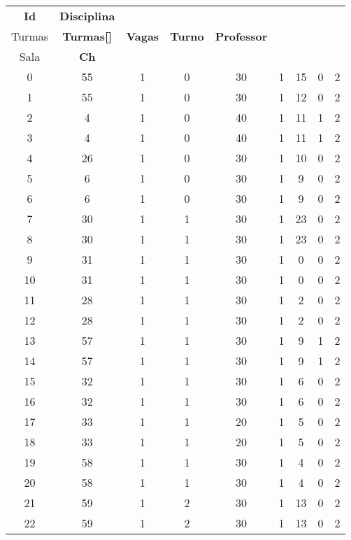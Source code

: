 \begin{apendices}
{\footnotesize
\begin{longtable}{|c|c|c|c|c|c|c|c|c|}
\hline
\textbf{Id} & \textbf{Disciplina} & \textbf{\begin{tabular}[c]{@{}c@{}}Nº de\\ Turmas\end{tabular}} & \textbf{Turmas{[}{]}} & \textbf{Vagas} & \textbf{Turno} & \textbf{Professor} & \textbf{\begin{tabular}[c]{@{}c@{}}Tipo de\\ Sala\end{tabular}} & \textbf{Ch} \\ \hline
0 & 55 & 1 & 0 & 30 & 1 & 15 & 0 & 2 \\ \hline
1 & 55 & 1 & 0 & 30 & 1 & 12 & 0 & 2 \\ \hline
2 & 4 & 1 & 0 & 40 & 1 & 11 & 1 & 2 \\ \hline
3 & 4 & 1 & 0 & 40 & 1 & 11 & 1 & 2 \\ \hline
4 & 26 & 1 & 0 & 30 & 1 & 10 & 0 & 2 \\ \hline
5 & 6 & 1 & 0 & 30 & 1 & 9 & 0 & 2 \\ \hline
6 & 6 & 1 & 0 & 30 & 1 & 9 & 0 & 2 \\ \hline
7 & 30 & 1 & 1 & 30 & 1 & 23 & 0 & 2 \\ \hline
8 & 30 & 1 & 1 & 30 & 1 & 23 & 0 & 2 \\ \hline
9 & 31 & 1 & 1 & 30 & 1 & 0 & 0 & 2 \\ \hline
10 & 31 & 1 & 1 & 30 & 1 & 0 & 0 & 2 \\ \hline
11 & 28 & 1 & 1 & 30 & 1 & 2 & 0 & 2 \\ \hline
12 & 28 & 1 & 1 & 30 & 1 & 2 & 0 & 2 \\ \hline
13 & 57 & 1 & 1 & 30 & 1 & 9 & 1 & 2 \\ \hline
14 & 57 & 1 & 1 & 30 & 1 & 9 & 1 & 2 \\ \hline
15 & 32 & 1 & 1 & 30 & 1 & 6 & 0 & 2 \\ \hline
16 & 32 & 1 & 1 & 30 & 1 & 6 & 0 & 2 \\ \hline
17 & 33 & 1 & 1 & 20 & 1 & 5 & 0 & 2 \\ \hline
18 & 33 & 1 & 1 & 20 & 1 & 5 & 0 & 2 \\ \hline
19 & 58 & 1 & 1 & 30 & 1 & 4 & 0 & 2 \\ \hline
20 & 58 & 1 & 1 & 30 & 1 & 4 & 0 & 2 \\ \hline
21 & 59 & 1 & 2 & 30 & 1 & 13 & 0 & 2 \\ \hline
22 & 59 & 1 & 2 & 30 & 1 & 13 & 0 & 2 \\ \hline

\end{longtable}}
\end{apendices}

